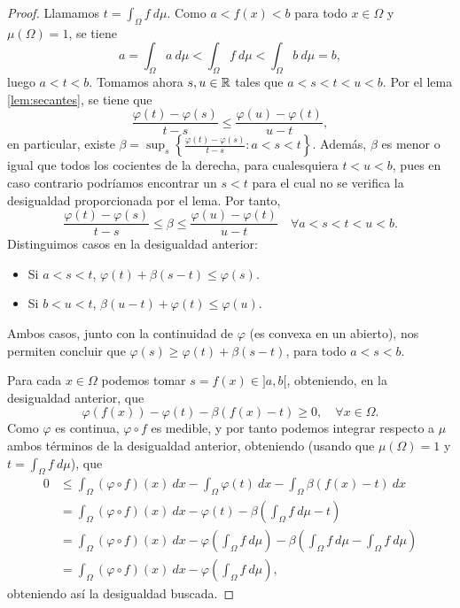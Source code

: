 \begin{proof}
    Llamamos $t = \int_{\Omega} f\ d\mu$. Como $a < f(x) < b$ para todo $x \in \Omega$ y $\mu(\Omega) = 1$, se tiene
    \[a = \int_{\Omega} a \ d\mu < \int_{\Omega}f\ d\mu < \int_{\Omega} b \ d\mu = b, \]
    luego $a < t < b$. Tomamos ahora $s,u \in \mathbb{R}$ tales que $a < s < t < u < b$. Por el lema \ref{lem:secantes}, se tiene que
    \[ \frac{\varphi(t)- \varphi(s)}{t-s} \le \frac{\varphi(u) - \varphi(t)}{u-t}, \]
    en particular, existe $\beta = \sup_{s} \left\{ \frac{\varphi(t)-\varphi(s)}{t-s} \colon a < s < t \right\}$. Además, $\beta$ es menor o igual que todos los cocientes de la derecha, para cualesquiera $t < u < b$, pues en caso contrario podríamos encontrar un $s < t$ para el cual no se verifica la desigualdad proporcionada por el lema. Por tanto,
    \begin{equation}
        \frac{\varphi(t)-\varphi(s)}{t-s} \le \beta \le \frac{\varphi(u) - \varphi(t)}{u-t} \quad \forall a < s < t < u < b.
    \end{equation}
    Distinguimos casos en la desigualdad anterior:
    \begin{itemize}
        \item Si $a < s < t$, $\varphi(t) + \beta (s-t) \le \varphi(s)$.
        \item Si $b < u < t$, $\beta(u-t) + \varphi(t) \le \varphi(u)$.
    \end{itemize}
    Ambos casos, junto con la continuidad de $\varphi$ (es convexa en un abierto), nos permiten concluir que $\varphi(s) \ge \varphi(t) + \beta(s-t)$, para todo $a < s < b$.

    Para cada $x \in \Omega$ podemos tomar $s = f(x) \in ]a,b[$, obteniendo, en la desigualdad anterior, que
    \begin{equation} \label{eq:jensen:1}
        \varphi(f(x)) - \varphi(t) - \beta(f(x) - t) \ge 0, \quad \forall x \in \Omega.
    \end{equation}
    Como $\varphi$ es continua, $\varphi \circ f$ es medible, y por tanto podemos integrar respecto a $\mu$ ambos términos de la desigualdad anterior, obteniendo (usando que $\mu(\Omega) = 1$ y $t = \int_{\Omega}f\ d\mu$), que
    \begin{align*}
        0 &\le \int_{\Omega}(\varphi \circ f)(x) \ dx - \int_{\Omega} \varphi(t)\ dx - \int_{\Omega}\beta(f(x)-t)\ dx \\
          &= \int_{\Omega}(\varphi \circ f)(x)\ dx - \varphi(t) - \beta\left( \int_{\Omega} f \ d\mu - t\right) \\
          &= \int_{\Omega}(\varphi \circ f)(x)\ dx - \varphi\left( \int_{\Omega}f\ d\mu \right) - \beta\left(\int_{\Omega} f \ d\mu - \int_{\Omega} f \ d\mu\right) \\
          &= \int_{\Omega}(\varphi \circ f)(x)\ dx - \varphi\left( \int_{\Omega}f\ d\mu \right),
    \end{align*}
    obteniendo así la desigualdad buscada.


\end{proof}
